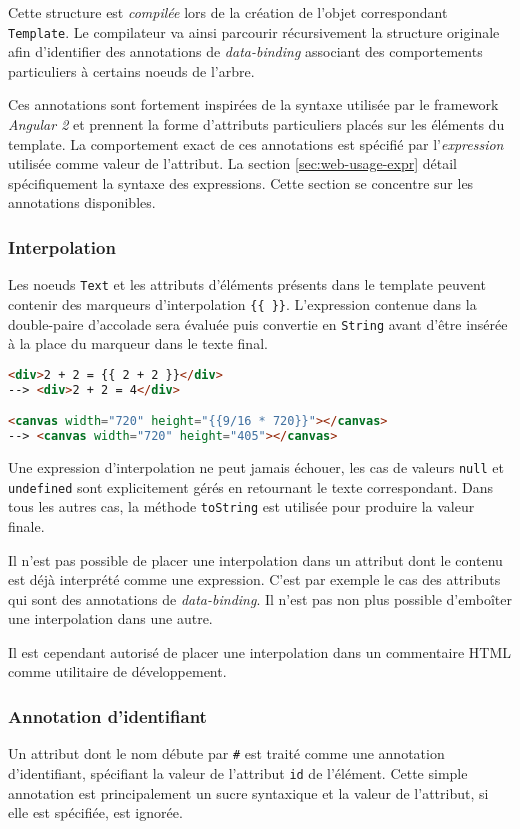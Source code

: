 Cette structure est \emph{compilée} lors de la création de l'objet correspondant \texttt{Template}. Le compilateur va ainsi parcourir récursivement la structure originale afin d'identifier des annotations de \emph{data-binding} associant des comportements particuliers à certains noeuds de l'arbre.

Ces annotations sont fortement inspirées de la syntaxe utilisée par le framework \emph{Angular 2} et prennent la forme d'attributs particuliers placés sur les éléments du template. La comportement exact de ces annotations est spécifié par l'\emph{expression} utilisée comme valeur de l'attribut. La section \ref{sec:web-usage-expr} détail spécifiquement la syntaxe des expressions. Cette section se concentre sur les annotations disponibles.

\subsubsection{Interpolation}
Les noeuds \texttt{Text} et les attributs d'éléments présents dans le template peuvent contenir des marqueurs d'interpolation \texttt{\{\{ \}\}}. L'expression contenue dans la double-paire d'accolade sera évaluée puis convertie en \texttt{String} avant d'être insérée à la place du marqueur dans le texte final.

\begin{lstlisting}[language=HTML]
<div>2 + 2 = {{ 2 + 2 }}</div>
--> <div>2 + 2 = 4</div>

<canvas width="720" height="{{9/16 * 720}}"></canvas>
--> <canvas width="720" height="405"></canvas>
\end{lstlisting}

Une expression d'interpolation ne peut jamais échouer, les cas de valeurs \texttt{null} et \texttt{undefined} sont explicitement gérés en retournant le texte correspondant. Dans tous les autres cas, la méthode \texttt{toString} est utilisée pour produire la valeur finale.

Il n'est pas possible de placer une interpolation dans un attribut dont le contenu est déjà interprété comme une expression. C'est par exemple le cas des attributs qui sont des annotations de \emph{data-binding}. Il n'est pas non plus possible d'emboîter une interpolation dans une autre.

Il est cependant autorisé de placer une interpolation dans un commentaire HTML comme utilitaire de développement.

\subsubsection{Annotation d'identifiant}
Un attribut dont le nom débute par \texttt{\#} est traité comme une annotation d'identifiant, spécifiant la valeur de l'attribut \texttt{id} de l'élément. Cette simple annotation est principalement un sucre syntaxique et la valeur de l'attribut, si elle est spécifiée, est ignorée.

